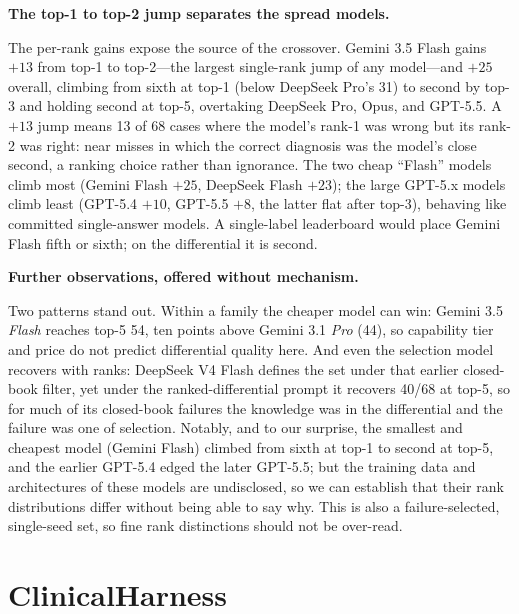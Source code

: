 \documentclass{article}
\renewcommand{\paragraph}[1]{%
  \par\addvspace{0.42\baselineskip}%
  \noindent\textbf{#1}\par\nobreak\vspace{-0.28\baselineskip}%
}
\begin{document}
\paragraph{The top-1 to top-2 jump separates the spread models.} The per-rank gains expose the source of the
crossover.
Gemini 3.5 Flash gains $+13$ from top-1 to top-2---the largest single-rank jump of any model---and $+25$
overall, climbing from sixth at top-1 (below DeepSeek Pro's 31) to second by top-3 and holding second at
top-5, overtaking DeepSeek Pro, Opus, and GPT-5.5. A $+13$ jump means 13 of 68 cases where the model's rank-1
was wrong but its rank-2 was right: near misses in which the correct diagnosis was the model's close second,
a ranking choice rather than ignorance. The two cheap ``Flash'' models climb most (Gemini Flash $+25$,
DeepSeek Flash $+23$); the large GPT-5.x models climb least (GPT-5.4 $+10$, GPT-5.5 $+8$, the latter flat
after top-3), behaving like committed single-answer models. A single-label leaderboard would place Gemini
Flash fifth or sixth; on the differential it is second.

\paragraph{Further observations, offered without mechanism.} Two patterns stand out. Within a family the
cheaper model can win: Gemini 3.5 \emph{Flash} reaches top-5 54, ten points above Gemini 3.1 \emph{Pro} (44),
so capability tier and price do not predict differential quality here. And even the selection model recovers
with ranks: DeepSeek V4 Flash defines the set under that earlier closed-book filter, yet under the
ranked-differential prompt it recovers 40/68 at top-5, so for much of its closed-book failures the knowledge
was in the differential and the failure was one of selection. Notably, and to our surprise, the smallest and
cheapest model (Gemini Flash) climbed from sixth at top-1 to second at top-5, and the earlier GPT-5.4 edged
the later GPT-5.5; but the training data and
architectures of these models are undisclosed, so we can establish that their rank distributions differ
without being able to say why. This is also a failure-selected, single-seed set, so fine rank distinctions
should not be over-read.



\section{ClinicalHarness}\label{sec:harness}
\end{document}
